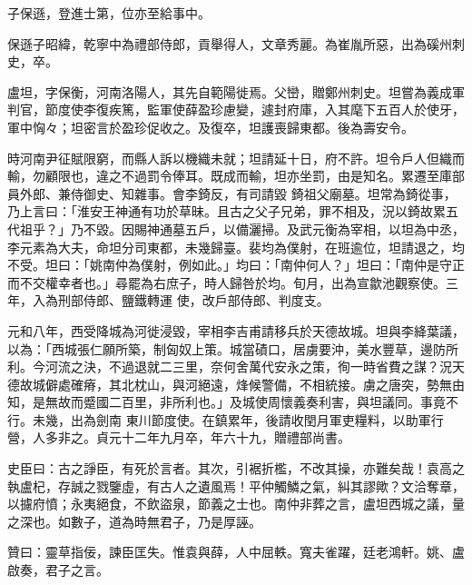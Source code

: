 \begin{pinyinscope}
 子保遜，登進士第，位亦至給事中。



 保遜子昭緯，乾寧中為禮部侍郎，貢舉得人，文章秀麗。為崔胤所惡，出為磎州刺史，卒。



 盧坦，字保衡，河南洛陽人，其先自範陽徙焉。父巒，贈鄭州刺史。坦嘗為義成軍判官，節度使李復疾篤，監軍使薛盈珍慮變，遽封府庫，入其麾下五百人於使牙，軍中恟々；坦密言於盈珍促收之。及復卒，坦護喪歸東都。後為壽安令。



 時河南尹征賦限窮，而縣人訴以機織未就；坦請延十日，府不許。坦令戶人但織而輸，勿顧限也，違之不過罰令俸耳。既成而輸，坦亦坐罰，由是知名。累遷至庫部員外郎、兼侍御史、知雜事。會李錡反，有司請毀
 錡祖父廟墓。坦常為錡從事，乃上言曰：「淮安王神通有功於草昧。且古之父子兄弟，罪不相及，況以錡故累五代祖乎？」乃不毀。因賜神通墓五戶，以備灑掃。及武元衡為宰相，以坦為中丞，李元素為大夫，命坦分司東都，未幾歸臺。裴均為僕射，在班逾位，坦請退之，均不受。坦曰：「姚南仲為僕射，例如此。」均曰：「南仲何人？」坦曰：「南仲是守正而不交權幸者也。」尋罷為右庶子，時人歸咎於均。旬月，出為宣歙池觀察使。三年，入為刑部侍郎、鹽鐵轉運
 使，改戶部侍郎、判度支。



 元和八年，西受降城為河徙浸毀，宰相李吉甫請移兵於天德故城。坦與李絳葉議，以為：「西城張仁願所築，制匈奴上策。城當磧口，居虜要沖，美水豐草，邊防所利。今河流之決，不過退就二三里，奈何舍萬代安永之策，徇一時省費之謀？況天德故城僻處確瘠，其北枕山，與河絕遠，烽候警備，不相統接。虜之唐突，勢無由知，是無故而蹙國二百里，非所利也。」及城使周懷義奏利害，與坦議同。事竟不行。未幾，出為劍南
 東川節度使。在鎮累年，後請收閏月軍吏糧料，以助軍行營，人多非之。貞元十二年九月卒，年六十九，贈禮部尚書。



 史臣曰：古之諍臣，有死於言者。其次，引裾折檻，不改其操，亦難矣哉！袁高之執盧杞，存誠之戮鑒虛，有古人之遺風焉！平仲觸鱗之氣，糾其謬歟？文洽奪章，以攄府憤；永夷絕食，不飲盜泉，節義之士也。南仲非葬之言，盧坦西城之議，量之深也。如數子，道為時無君子，乃是厚誣。



 贊曰：靈草指佞，諫臣匡失。惟袁與薛，人中屈軼。寬夫雀躍，廷老鴻軒。姚、盧啟奏，君子之言。



\end{pinyinscope}